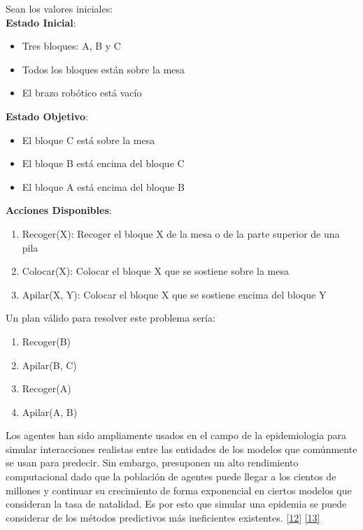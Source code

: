 \documentclass{article}
\begin{document}
        Sean los valores iniciales: \\

        \textbf{ Estado Inicial}:
        \begin{itemize}
        \item  Tres bloques: A, B y C
        \item  Todos los bloques están sobre la mesa
        \item  El brazo robótico está vacío \\
        \end{itemize}

        \textbf{ Estado Objetivo}:
        \begin{itemize}
        \item  El bloque C está sobre la mesa
        \item  El bloque B está encima del bloque C
        \item  El bloque A está encima del bloque B \\

        \end{itemize}

        \textbf{Acciones Disponibles}:
        \begin{enumerate}

        \item  Recoger(X): Recoger el bloque X de la mesa o de la parte superior de una pila
        \item  Colocar(X): Colocar el bloque X que se sostiene sobre la mesa
        \item  Apilar(X, Y): Colocar el bloque X que se sostiene encima del bloque Y \\

        \end{enumerate}

        Un plan válido para resolver este problema sería:
        \begin{enumerate}

        \item  Recoger(B)
        \item  Apilar(B, C)
        \item  Recoger(A)
        \item  Apilar(A, B)
        \end{enumerate}

    Los agentes han sido ampliamente usados en el campo de la epidemiologia para simular interacciones realistas entre las entidades de los modelos que comúnmente se usan para predecir. Sin embargo, presuponen un alto rendimiento computacional dado que la población de agentes puede llegar a los cientos de millones y continuar su crecimiento de forma exponencial en ciertos modelos que consideran la tasa de natalidad. Es por esto que simular una epidemia se puede considerar de los métodos predictivos más ineficientes existentes. \hyperref[sec:22]{[12]} \hyperref[sec:23]{[13]}
\end{document}
